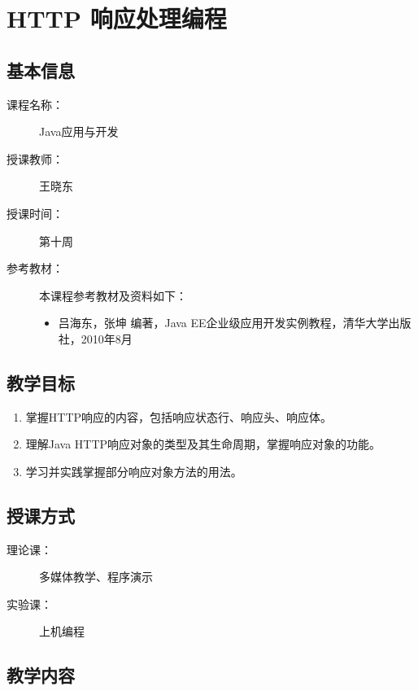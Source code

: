 \chapter{HTTP 响应处理编程}
\label{chp:JavaEE-HTTP-response-handling}

\section*{基本信息}
\sline
\begin{description}
\item[课程名称：] Java应用与开发
\item[授课教师：] 王晓东
\item[授课时间：] 第十周
\item[参考教材：] 本课程参考教材及资料如下：
  \begin{itemize}
  \item 吕海东，张坤 编著，Java EE企业级应用开发实例教程，清华大学出版社，2010年8月
  \end{itemize}
\end{description}

\section*{教学目标}

\sline

\begin{enumerate}
\item 掌握HTTP响应的内容，包括响应状态行、响应头、响应体。
\item 理解Java HTTP响应对象的类型及其生命周期，掌握响应对象的功能。
\item 学习并实践掌握部分响应对象方法的用法。
\end{enumerate}  

\section*{授课方式}

\sline
\begin{description}
\item[理论课：] 多媒体教学、程序演示
\item[实验课：] 上机编程
\end{description}

\newpage
\section*{教学内容}
\sline

